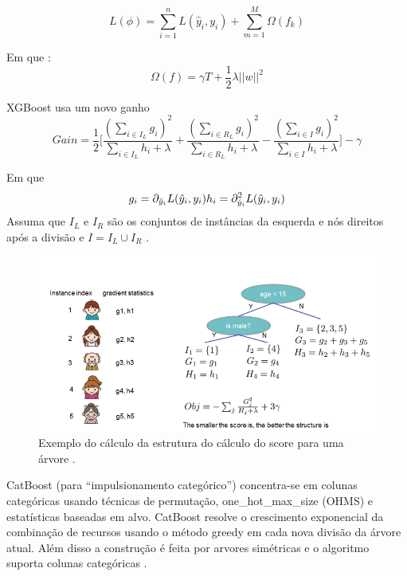 \begin{equation}
    L(\phi) = \sum_{i=1}^nL(\hat{y}_i,y_i) + \sum_{m=1}^M\Omega(f_k)
\end{equation}

Em que :
\begin{equation}
    \Omega(f) = \gamma T + \frac{1}{2}\lambda||w||^2
\end{equation}


XGBoost usa um novo ganho
\begin{equation} \label{eq:gain}
    Gain = \frac{1}{2}\Bigg[ \frac{(\sum_{i\in I_L}g_i)^2}{\sum_{i\in I_L}h_i + \lambda} + \frac{(\sum_{i\in R_L}g_i)^2}{\sum_{i\in R_L}h_i + \lambda} - \frac{(\sum_{i\in I}g_i)^2}{\sum_{i\in I}h_i + \lambda} \Bigg] - \gamma
\end{equation}

Em que
\begin{equation}
    g_i = \partial_{\hat{y}_i}L(\hat{y}_i,y_i) \\ 
    h_i = \partial^2_{\hat{y}_i}L(\hat{y}_i,y_i)
\end{equation}
Assuma que $I_L$ e $I_R$ são os conjuntos de instâncias da esquerda e nós direitos após a divisão e $I = I_L\cup I_R$ \cite{article:xgboost,doc:xgboost}.

\begin{figure}[H]
 \caption{Exemplo do cálculo da estrutura do cálculo do score para uma árvore \cite{article:xgboost}.}
 \label{fig:ex:xgboost}
 \centering
 \includegraphics[scale=0.4]{images/estrutura_score_xgboost.png}
\end{figure}

CatBoost (para “impulsionamento categórico”) concentra-se em colunas categóricas usando técnicas de permutação, one\_hot\_max\_size (OHMS) e estatísticas baseadas em alvo. CatBoost resolve o crescimento exponencial da combinação de recursos usando o método greedy em cada nova divisão da árvore atual. Além disso a construção é feita por arvores simétricas e o algoritmo suporta colunas categóricas \cite{article:catboost,doc:catboost}.

